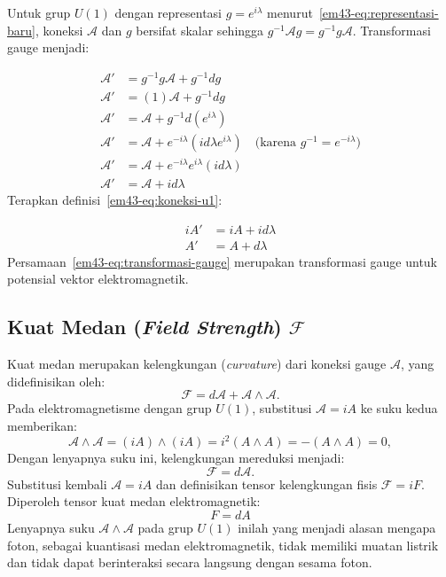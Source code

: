Untuk grup $U(1)$ dengan representasi $g = e^{i\lambda}$ menurut~\eqref{em43-eq:representasi-baru}, koneksi $\mathcal{A}$ dan $g$ bersifat skalar sehingga $g^{-1}\mathcal{A}g=g^{-1}g\mathcal{A}$. Transformasi gauge menjadi:

\begin{align}
\mathcal{A}' &= g^{-1}g\mathcal{A} + g^{-1}dg \nonumber \\
\mathcal{A}' &= (1)\mathcal{A} + g^{-1}dg \nonumber \\
\mathcal{A}' &= \mathcal{A} + g^{-1}d(e^{i \lambda}) \nonumber \\
\mathcal{A}' &= \mathcal{A} + e^{-i \lambda}(i d\lambda e^{i \lambda}) \quad \text{(karena $g^{-1} = e^{-i \lambda}$)} \nonumber \\ 
\mathcal{A}' &= \mathcal{A} + e^{-i \lambda}e^{i \lambda}(id\lambda) \nonumber \\ 
\mathcal{A}' &= \mathcal{A} + id\lambda
\end{align}
Terapkan definisi~\eqref{em43-eq:koneksi-u1}:

\begin{align}
  iA' &= iA+ id\lambda \nonumber \\
  A' &= A+ d\lambda \label{em43-eq:transformasi-gauge}
\end{align}
Persamaan~\eqref{em43-eq:transformasi-gauge} merupakan transformasi gauge untuk potensial vektor elektromagnetik.

\subsection{Kuat Medan (\textit{Field Strength}) $\mathcal{F}$}

Kuat medan merupakan kelengkungan (\textit{curvature}) dari koneksi gauge $\mathcal{A}$, yang didefinisikan oleh:
\begin{equation}\label{em43-eq:kuat-medan}
  \mathcal{F} = d\mathcal{A} + \mathcal{A} \wedge \mathcal{A}.
\end{equation}
Pada elektromagnetisme dengan grup $U(1)$, substitusi $\mathcal{A} = iA$ ke suku kedua memberikan:
\begin{equation}
  \mathcal{A} \wedge \mathcal{A} = (iA) \wedge (iA) = i^2 (A \wedge A) = - (A \wedge A)=0,
\end{equation}
Dengan lenyapnya suku ini, kelengkungan mereduksi menjadi:
\begin{equation}
  \mathcal{F} = d\mathcal{A}.
\end{equation}
Substitusi kembali $\mathcal{A} = iA$ dan definisikan tensor kelengkungan fisis $\mathcal{F} = iF$. Diperoleh tensor kuat medan elektromagnetik:
\begin{equation}
  F = d A
\end{equation}
Lenyapnya suku $\mathcal{A} \wedge \mathcal{A}$ pada grup $U(1)$ inilah yang menjadi alasan mengapa foton, sebagai kuantisasi medan elektromagnetik, tidak memiliki muatan listrik dan tidak dapat berinteraksi secara langsung dengan sesama foton.

